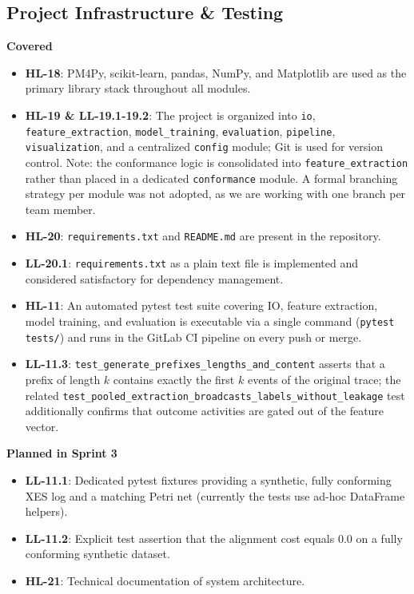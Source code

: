 \documentclass[12pt,a4paper]{article}
\newcommand{\newcov}[1]{\colorbox{green!40}{\textbf{#1}}}
\begin{document}
\subsection{Project Infrastructure \& Testing}
\textbf{Covered}
\begin{itemize}
    \item \textbf{HL-18}: PM4Py, scikit-learn, pandas, NumPy, and Matplotlib are used as the primary library stack throughout all modules.
    \item \textbf{HL-19 \& LL-19.1-19.2}: The project is organized into \texttt{io}, \texttt{feature\_extraction}, \texttt{model\_training}, \texttt{evaluation}, \texttt{pipeline}, \texttt{visualization}, and a centralized \texttt{config} module; Git is used for version control. Note: the conformance logic is consolidated into \texttt{feature\_extraction} rather than placed in a dedicated \texttt{conformance} module. A formal branching strategy per module was not adopted, as we are working with one branch per team member.
    \item \textbf{HL-20}: \texttt{requirements.txt} and \texttt{README.md} are present in the repository.
    \item \textbf{LL-20.1}: \texttt{requirements.txt} as a plain text file is implemented and considered satisfactory for dependency management.
    \item \newcov{HL-11}: An automated pytest test suite covering IO, feature extraction, model training, and evaluation is executable via a single command (\texttt{pytest tests/}) and runs in the GitLab CI pipeline on every push or merge.
    \item \newcov{LL-11.3}: \texttt{test\_generate\_prefixes\_lengths\_and\_content} asserts that a prefix of length $k$ contains exactly the first $k$ events of the original trace; the related \texttt{test\_pooled\_extraction\_broadcasts\_labels\_without\_leakage} test additionally confirms that outcome activities are gated out of the feature vector.
\end{itemize}

\noindent \textbf{Planned in Sprint 3}
\begin{itemize}
    \item \textbf{LL-11.1}: Dedicated pytest fixtures providing a synthetic, fully conforming XES log and a matching Petri net (currently the tests use ad-hoc DataFrame helpers).
    \item \textbf{LL-11.2}: Explicit test assertion that the alignment cost equals $0.0$ on a fully conforming synthetic dataset.
    \item \textbf{HL-21}: Technical documentation of system architecture.
\end{itemize}
\end{document}
